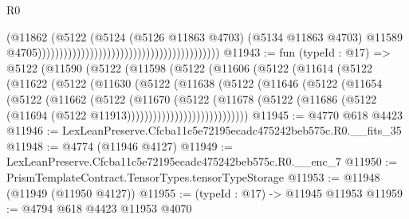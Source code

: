 \begin{lexlean}{R0}
\begin{coremodule}
                                                                                  (@11862
                                                                                    (@5122
                                                                                      (@5124
                                                                                        (@5126
                                                                                          @11863
                                                                                          @4703)
                                                                                        (@5134
                                                                                          @11863
                                                                                          @4703)
                                                                                        @11589
                                                                                        @4705))))))))))))))))))))))))))))))))))))))))))
@11943 := fun (typeId : @17) =>
  @5122
    (@11590
      (@5122
        (@11598
          (@5122
            (@11606
              (@5122
                (@11614
                  (@5122
                    (@11622
                      (@5122
                        (@11630
                          (@5122
                            (@11638
                              (@5122
                                (@11646
                                  (@5122
                                    (@11654
                                      (@5122
                                        (@11662
                                          (@5122
                                            (@11670
                                              (@5122
                                                (@11678
                                                  (@5122
                                                    (@11686
                                                      (@5122
                                                        (@11694
                                                          (@5122 @11913))))))))))))))))))))))))))))
@11945 := @4770 @618 @4423
@11946 := LexLeanPreserve.Cfcba11c5e72195ecadc475242beb575c.R0.__fits_35
@11948 := @4774 (@11946 @4127)
@11949 := LexLeanPreserve.Cfcba11c5e72195ecadc475242beb575c.R0.__enc_7
@11950 := PrismTemplateContract.TensorTypes.tensorTypeStorage
@11953 := @11948 (@11949 (@11950 @4127))
@11955 := (typeId : @17) -> @11945 @11953
@11959 := @4794 @618 @4423 @11953 @4070

\end{coremodule}
\end{lexlean}
